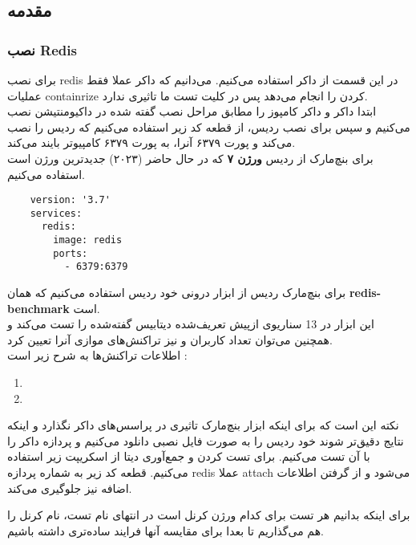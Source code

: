 \subsection{مقدمه}
\subsubsection{نصب Redis}
برای نصب 
redis 
در این قسمت از داکر
استفاده می‌کنیم.
می‌دانیم که داکر 
عملا فقط عملیات 
containrize 
کردن را انجام
می‌دهد
پس  در کلیت تست ما 
تاثیری ندارد.
\\
ابتدا داکر و داکر کامپوز را مطابق مراحل نصب گفته شده در
داکیومنتیشن نصب می‌کنیم و سپس 
برای نصب ردیس، از قطعه کد زیر استفاده می‌کنیم که 
ردیس را نصب می‌کند و پورت ۶۳۷۹ آنرا، به پورت ۶۳۷۹ کامپیوتر بایند می‌کند.
\\
برای بنچ‌مارک از ردیس \textbf{ورژن ۷} که در حال حاضر (۲۰۲۳) 
جدیدترین ورژن است استفاده می‌کنیم.
\begin{latin}
  \begin{verbatim}
    version: '3.7'
    services:
      redis:
        image: redis
        ports:
          - 6379:6379    
  \end{verbatim}
\end{latin}
\noindent
برای بنچ‌مارک ردیس از ابزار درونی خود ردیس استفاده می‌کنیم که همان 
\textbf{redis-benchmark}
است.
\\
این ابزار در 13 سناریوی ازپیش‌ تعریف‌‌شده دیتابیس گفته‌شده را تست می‌کند و همچنین می‌توان تعداد کاربران و نیز
تراکنش‌های موازی آنرا تعیین کرد.
\\
اطلاعات تراکنش‌ها به شرح زیر است :‌
\begin{enumerate}
    \item {}
    \item {}
\end{enumerate}
نکته این است که برای اینکه ابزار بنچ‌مارک تاثیری در پراسس‌های داکر نگذارد و اینکه نتایج دقیق‌تر شوند خود ردیس را به صورت فایل نصبی دانلود می‌کنیم و پردازه داکر را با آن تست می‌کنیم.
برای تست کردن و جمع‌آوری دیتا از اسکریپت زیر استفاده می‌کنیم.
قطعه کد زیر به شماره پردازه redis عملا attach می‌شود و از گرفتن اطلاعات اضافه نیز جلوگیری می‌کند.
\begin{latin}
\end{latin}
\noindent
برای اینکه بدانیم هر تست برای کدام ورژن کرنل است در انتهای نام تست، نام کرنل را هم می‌گذاریم تا بعدا برای 
مقایسه آنها فرایند ساده‌تری داشته باشیم.

